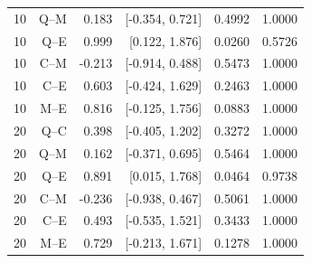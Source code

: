 \begin{longtable}{@{}lrrrrr@{}}
10 & Q--M & 0.183 & [-0.354, 0.721] & 0.4992 & 1.0000\\

10 & Q--E & 0.999 & [0.122, 1.876] & 0.0260 & 0.5726\\

10 & C--M & -0.213 & [-0.914, 0.488] & 0.5473 & 1.0000\\

10 & C--E & 0.603 & [-0.424, 1.629] & 0.2463 & 1.0000\\

10 & M--E & 0.816 & [-0.125, 1.756] & 0.0883 & 1.0000\\

20 & Q--C & 0.398 & [-0.405, 1.202] & 0.3272 & 1.0000\\

20 & Q--M & 0.162 & [-0.371, 0.695] & 0.5464 & 1.0000\\

20 & Q--E & 0.891 & [0.015, 1.768] & 0.0464 & 0.9738\\

20 & C--M & -0.236 & [-0.938, 0.467] & 0.5061 & 1.0000\\

20 & C--E & 0.493 & [-0.535, 1.521] & 0.3433 & 1.0000\\

20 & M--E & 0.729 & [-0.213, 1.671] & 0.1278 & 1.0000\\

\end{longtable}\endgroup

\begingroup\footnotesize\setlength{\tabcolsep}{4pt}\renewcommand{\arraystretch}{1.1}

